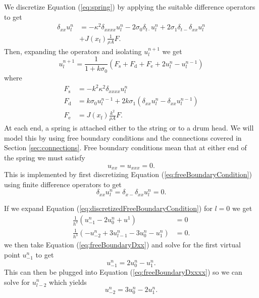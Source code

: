 \documentclass{article}
\begin{document}
We discretize Equation (\ref{eq:spring}) by applying the suitable difference operators to get
\begin{equation}
  \begin{split}
  \delta_{xx} u^n_l &= -\kappa^2 \delta_{xxxx} u^n_l- 2 \sigma_0 \delta_{t\cdot} u^n_l + 2 \sigma_1 \delta_{t-} \delta_{xx}u^n_l\\
  & + J(x_\text{f})\frac{1}{\rho A} F.
  \end{split}
\end{equation}
Then, expanding the operators and isolating $u^{n+1}_l$ we get
\begin{equation}
u^{n+1}_l = \frac{1}{1 + k\sigma_0} (F_\text{s} + F_\text{d} + F_\text{e} + 2u^n_l - u^{n-1}_l)
\end{equation}
where
\begin{align}
  F_\text{s} &= -k^2 \kappa^2 \delta_{xxxx} u^n_l\\
  F_\text{d} &= k\sigma_0u^{n-1}_l + 2k\sigma_1 (\delta_{xx}u^n_l - \delta_{xx}u^{n-1}_l)\\
  F_\text{e} &= J(x_\text{f})\frac{k^2}{\rho A}F.
\end{align}
%
At each end, a spring is attached either to the string or to a drum head.
We will model this by using free boundary conditions and the connections covered in Section \ref{sec:connections}.
Free boundary conditions mean that at either end of the spring we must satisfy \cite{bilbao_numerical_2009}
\begin{equation}
  \label{eq:freeBoundaryCondition}
  u_{xx} = u_{xxx} = 0.
\end{equation}
%
This is implemented by first discretizing Equation (\ref{eq:freeBoundaryCondition}) using finite difference operators to get
\begin{equation}
  \label{eq:discretizedFreeBoundaryCondition}
  \delta_{xx} u^n_l = \delta_{x-}\delta_{xx} u^n_l = 0.
\end{equation}

If we expand Equation (\ref{eq:discretizedFreeBoundaryCondition}) for $l = 0$ we get
\begin{align}
  \frac{1}{h^2} (u^n_{-1} - 2 u^{n}_0 + u^{1}) &= 0 \label{eq:freeBoundaryDxx}\\
  \frac{1}{h^3} (-u^n_{-2} + 3u^n_{l-1} - 3u^n_0 - u^n_{1}) &= 0 \label{eq:freeBoundaryDxxxx}.
\end{align}
we then take Equation (\ref{eq:freeBoundaryDxx}) and solve for the first virtual point $u^n_{-1}$ to get
\begin{equation}
  u^n_{-1} = 2 u^n_0 - u^n_1.
\end{equation}
This can then be plugged into Equation (\ref{eq:freeBoundaryDxxxx}) so we can solve for $u^n_{l-2}$ which yields
\begin{equation}
  u^n_{-2} = 3 u^n_0 - 2u^n_1.
\end{equation}
\end{document}
